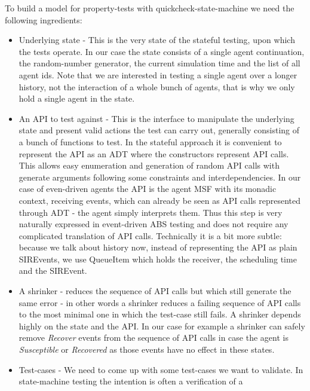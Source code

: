 To build a model for property-tests with quickcheck-state-machine we need the following ingredients:

\begin{itemize}
	\item Underlying state - This is the very state of the stateful testing, upon which the tests operate. In our case the state consists of a single agent continuation, the random-number generator, the current simulation time and the list of all agent ids. Note that we are interested in testing a single agent over a longer history, not the interaction of a whole bunch of agents, that is why we only hold a single agent in the state.
	
	\item An API to test against - This is the interface to manipulate the underlying state and present valid actions the test can carry out, generally consisting of a bunch of functions to test. In the stateful approach it is convenient to represent the API as an ADT where the constructors represent API calls. This allows easy enumeration and generation of random API calls with generate arguments following some constraints and interdependencies. In our case of even-driven agents the API is the agent MSF with its monadic context, receiving events, which can already be seen as API calls represented through ADT - the agent simply interprets them. Thus this step is very naturally expressed in event-driven ABS testing and does not require any complicated translation of API calls. Technically it is a bit more subtle: because we talk about history now, instead of representing the API as plain SIREvents, we use QueueItem which holds the receiver, the scheduling time and the SIREvent.
	
	\item A shrinker - reduces the sequence of API calls but which still generate the same error - in other words a shrinker reduces a failing sequence of API calls to the most minimal one in which the test-case still fails. A shrinker depends highly on the state and the API. In our case for example a shrinker can safely remove \textit{Recover} events from the sequence of API calls in case the agent is \textit{Susceptible} or \textit{Recovered} as those events have no effect in these states.
	
	\item Test-cases - We need to come up with some test-cases we want to validate. In state-machine testing the intention is often a verification of a 
\end{itemize}


